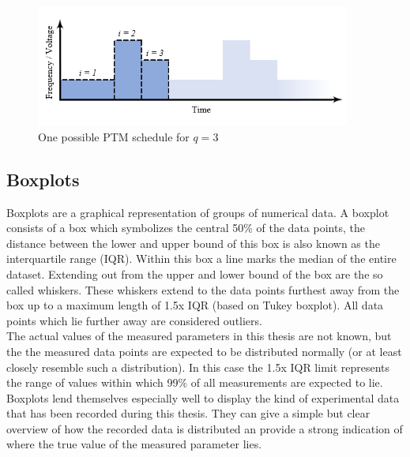 \begin{figure}[H]
  \centering
  \includegraphics[height=4cm]{figures/gmpt_sched}
  \caption[GMPT Schedule]{One possible PTM schedule for $q = 3$}\label{fig:i_sched_gmpt}
\end{figure}

\subsection{Boxplots}
Boxplots are a graphical representation of groups of numerical data. A boxplot consists of a box which symbolizes the central 50\% of the data points, the distance between the lower and upper bound of this box is also known as the interquartile range (IQR). Within this box a line marks the median of the entire dataset. Extending out from the upper and lower bound of the box are the so called whiskers. These whiskers extend to the data points furthest away from the box up to a maximum length of 1.5x IQR (based on Tukey boxplot). All data points which lie further away are considered outliers.\\
\hspace*{0.5ex}\hspace{0.5ex} The actual values of the measured parameters in this thesis are not known, but the the measured data points are expected to be distributed normally (or at least closely resemble such a distribution). In this case the 1.5x IQR limit represents the range of values within which 99\% of all measurements are expected to lie.\\
\hspace*{0.5ex}\hspace{0.5ex} Boxplots lend themselves especially well to display the kind of experimental data that has been recorded during this thesis. They can give a simple but clear overview of how the recorded data is distributed an provide a strong indication of where the true value of the measured parameter lies.